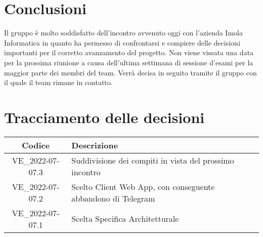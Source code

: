 \section{Conclusioni}
Il gruppo è molto soddisfatto dell'incontro avvenuto oggi con l'azienda Imola Informatica in quanto ha permesso di confrontarsi e compiere delle decisioni importanti per il corretto avanzamento del progetto. Non viene vissata una data per la prossima riunione a causa dell'ultima settimana di sessione d'esami per la maggior parte dei membri del team. 
Verrà decisa in seguito tramite il gruppo  con il quale il team rimane in contatto. 
\newpage

\section*{Tracciamento delle decisioni}
	\renewcommand{\arraystretch}{1.8} %
	\begin{tabular}{ |c|l| }
		\hline
		\textbf{Codice} & \textbf{Descrizione} \\
		\hline
		VE\_2022-07-07.3 & Suddivisione dei compiti in vista del prossimo incontro\\ 
		\hline
		VE\_2022-07-07.2 & Scelto Client Web App, con conseguente abbandono di Telegram\\ %
		\hline
		VE\_2022-07-07.1 & Scelta Specifica Architetturale \glossario{Stateless} \\ %
		\hline
	\end{tabular}